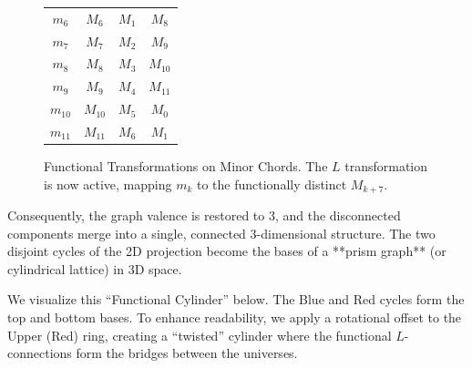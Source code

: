 \documentclass[12pt,letterpaper]{amsart}
\begin{document}
\begin{figure}[H]
\begin{minipage}{0.48\textwidth}
{\begin{tabular}{|c||c|c|c|}
        $m_6$ & $M_6$ & $M_1$ & $M_8$ \\
        $m_7$ & $M_7$ & $M_2$ & $M_9$ \\
        $m_8$ & $M_8$ & $M_3$ & $M_{10}$ \\
        $m_9$ & $M_9$ & $M_4$ & $M_{11}$ \\
        $m_{10}$ & $M_{10}$ & $M_5$ & $M_0$ \\
        $m_{11}$ & $M_{11}$ & $M_6$ & $M_1$ \\
        \hline
        \end{tabular}
        }
        \caption{\scriptsize Functional Transformations on Minor Chords. The $L$ transformation is now active, mapping $m_k$ to the functionally distinct $M_{k+7}$.}
    \end{minipage}
\end{figure}

Consequently, the graph valence is restored to 3, and the disconnected components merge into a single, connected 3-dimensional structure. The two disjoint cycles of the 2D projection become the bases of a **prism graph** (or cylindrical lattice) in 3D space.

We visualize this ``Functional Cylinder'' below. The Blue and Red cycles form the top and bottom bases. To enhance readability, we apply a rotational offset to the Upper (Red) ring, creating a ``twisted'' cylinder where the functional $L$-connections form the bridges between the universes.
\end{document}
